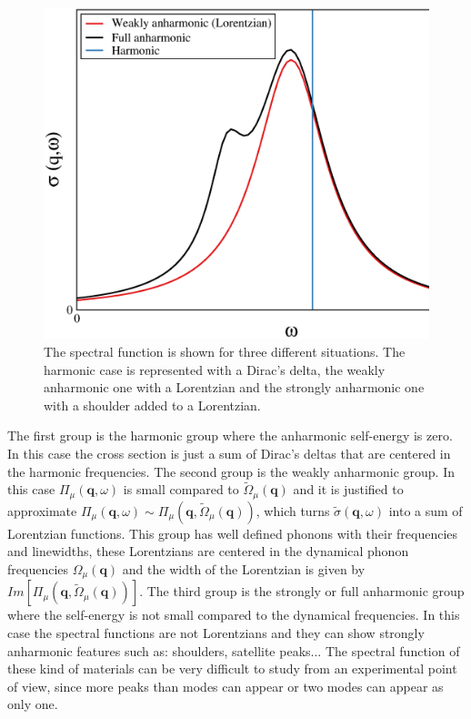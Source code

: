 \begin{figure}[h]
\begin{center}
\includegraphics[width=0.8\linewidth]{Figures/ins-toy.eps}
\caption{The spectral function is shown for three different situations. The harmonic case is represented with a Dirac's delta, the weakly anharmonic one with a Lorentzian and the strongly anharmonic one with a shoulder added to 
a Lorentzian.}
\label{instoy}
\end{center}
\end{figure}
The first group is the harmonic group where the anharmonic self-energy is zero. In this case the cross section is just a sum of Dirac's deltas that are centered in the harmonic frequencies. The second group is the weakly 
anharmonic group. In this case $\Pi_{\mu}(\mathbf{q},\omega)$ is small compared to $\tilde{\Omega}_{\mu}(\mathbf{q})$ and it is justified to 
approximate $\Pi_{\mu}(\mathbf{q},\omega)\sim\Pi_{\mu}(\mathbf{q},\tilde{\Omega}_{\mu}(\mathbf{q}))$, which turns $\tilde{\sigma}(\mathbf{q},\omega)$ into a sum of Lorentzian functions. This group has well defined phonons 
with their frequencies and linewidths, these Lorentzians are centered in the dynamical phonon frequencies $\Omega_{\mu}(\mathbf{q})$ and the width of the Lorentzian is given 
by $Im[\Pi_{\mu}(\mathbf{q},\tilde{\Omega}_{\mu}(\mathbf{q}))]$. The third group is the strongly or full anharmonic group where the self-energy is not small compared to the dynamical frequencies. In this case the spectral 
functions are not Lorentzians and they can show strongly anharmonic features such as: shoulders, satellite peaks$\dots$ The spectral function of these kind of materials can be very difficult to study from an experimental 
point of view, since more peaks than modes can appear or two modes can appear as only one. \\

